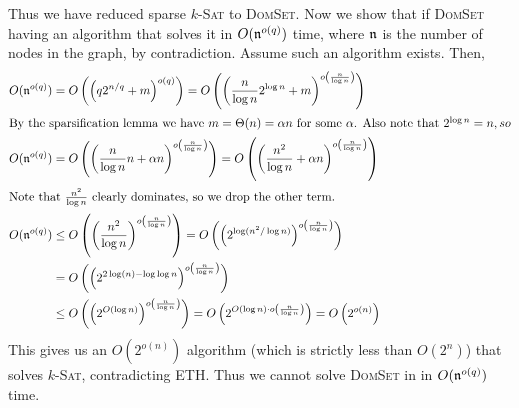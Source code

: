 \documentclass[12pt]{article}
\begin{document}
\begin{solution}
    Thus we have reduced sparse $k$-\textsc{Sat} to \textsc{DomSet}. 
    Now we show that if \textsc{DomSet} having an algorithm that solves it in $O(\operatorname{\mathfrak{n}}^{o(q)})$ time, where $\operatorname{\mathfrak{n}}$ is the number of nodes in the graph, by contradiction. Assume such an algorithm exists. Then, 
    \begin{align*}
        O(\operatorname{\mathfrak{n}}^{o(q)}) &= O\left(\left(q2^{n/q} + m\right)^{o(q)}\right) = O\left(\left(\frac{n}{\log n}2^{\log n} + m\right)^{o\left(\frac{n}{\log n} \right)}\right) \\ 
        \intertext{By the sparsification lemma we have $m = \Theta(n) = \alpha n$ for some $\alpha$. Also note that $2^{\log n} = n, so$}
        O(\operatorname{\mathfrak{n}}^{o(q)}) &= O\left(\left(\frac{n}{\log n}n + \alpha n\right)^{o\left(\frac{n}{\log n} \right)}\right) = O\left(\left(\frac{n^2}{\log n} + \alpha n\right)^{o\left(\frac{n}{\log n} \right)}\right)\\ 
        \intertext{Note that $\frac{n^2}{\log n}$ clearly dominates, so we drop the other term.}
        O(\operatorname{\mathfrak{n}}^{o(q)}) &\leq O\left(\left(\frac{n^2}{\log n}\right)^{o\left(\frac{n}{\log n} \right)}\right)  = O\left(\left(2^{\log(n^2/\log n)}\right)^ {o\left(\frac{n}{\log n} \right)}\right)  \\
        &= O\left(\left(2^{2 \log (n) - \log \log n}\right)^ {o\left(\frac{n}{\log n} \right)}\right)   \\ 
        & \leq O\left(\left(2^{O(\log n)}\right)^{o\left(\frac{n}{\log n}\right)}\right) = O\left(2^{{O(\log n)} \cdot {o\left(\frac{n}{\log n}\right)}}\right) = O\left(2^{{o(n)}}\right)
    \end{align*}
    This gives us an $O(2^{o(n)})$  algorithm (which is strictly less than $O(2^n)$) that solves $k$-\textsc{Sat}, contradicting ETH. 
    Thus we cannot solve \textsc{DomSet} in in $O(\operatorname{\mathfrak{n}}^{o(q)})$ time.  
\end{solution}
\end{document}
